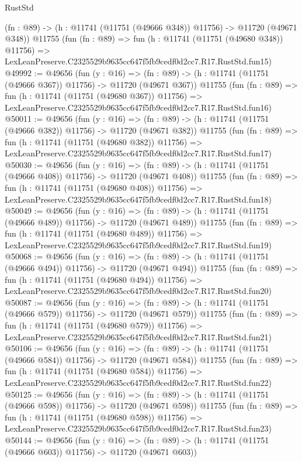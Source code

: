 \begin{lexlean}{RustStd}
\begin{coremodule}
    (fn : @89) -> (h : @11741 (@11751 (@49666 @348)) @11756) -> @11720 (@49671 @348))
    @11755
    (fun (fn : @89) =>
    fun (h : @11741 (@11751 (@49680 @348)) @11756) =>
    LexLeanPreserve.C2325529b9635cc647f5fb9cedf0d2cc7.R17.RustStd.fun15)
@49992 := @49656
    (fun (y : @16) =>
    (fn : @89) -> (h : @11741 (@11751 (@49666 @367)) @11756) -> @11720 (@49671 @367))
    @11755
    (fun (fn : @89) =>
    fun (h : @11741 (@11751 (@49680 @367)) @11756) =>
    LexLeanPreserve.C2325529b9635cc647f5fb9cedf0d2cc7.R17.RustStd.fun16)
@50011 := @49656
    (fun (y : @16) =>
    (fn : @89) -> (h : @11741 (@11751 (@49666 @382)) @11756) -> @11720 (@49671 @382))
    @11755
    (fun (fn : @89) =>
    fun (h : @11741 (@11751 (@49680 @382)) @11756) =>
    LexLeanPreserve.C2325529b9635cc647f5fb9cedf0d2cc7.R17.RustStd.fun17)
@50030 := @49656
    (fun (y : @16) =>
    (fn : @89) -> (h : @11741 (@11751 (@49666 @408)) @11756) -> @11720 (@49671 @408))
    @11755
    (fun (fn : @89) =>
    fun (h : @11741 (@11751 (@49680 @408)) @11756) =>
    LexLeanPreserve.C2325529b9635cc647f5fb9cedf0d2cc7.R17.RustStd.fun18)
@50049 := @49656
    (fun (y : @16) =>
    (fn : @89) -> (h : @11741 (@11751 (@49666 @489)) @11756) -> @11720 (@49671 @489))
    @11755
    (fun (fn : @89) =>
    fun (h : @11741 (@11751 (@49680 @489)) @11756) =>
    LexLeanPreserve.C2325529b9635cc647f5fb9cedf0d2cc7.R17.RustStd.fun19)
@50068 := @49656
    (fun (y : @16) =>
    (fn : @89) -> (h : @11741 (@11751 (@49666 @494)) @11756) -> @11720 (@49671 @494))
    @11755
    (fun (fn : @89) =>
    fun (h : @11741 (@11751 (@49680 @494)) @11756) =>
    LexLeanPreserve.C2325529b9635cc647f5fb9cedf0d2cc7.R17.RustStd.fun20)
@50087 := @49656
    (fun (y : @16) =>
    (fn : @89) -> (h : @11741 (@11751 (@49666 @579)) @11756) -> @11720 (@49671 @579))
    @11755
    (fun (fn : @89) =>
    fun (h : @11741 (@11751 (@49680 @579)) @11756) =>
    LexLeanPreserve.C2325529b9635cc647f5fb9cedf0d2cc7.R17.RustStd.fun21)
@50106 := @49656
    (fun (y : @16) =>
    (fn : @89) -> (h : @11741 (@11751 (@49666 @584)) @11756) -> @11720 (@49671 @584))
    @11755
    (fun (fn : @89) =>
    fun (h : @11741 (@11751 (@49680 @584)) @11756) =>
    LexLeanPreserve.C2325529b9635cc647f5fb9cedf0d2cc7.R17.RustStd.fun22)
@50125 := @49656
    (fun (y : @16) =>
    (fn : @89) -> (h : @11741 (@11751 (@49666 @598)) @11756) -> @11720 (@49671 @598))
    @11755
    (fun (fn : @89) =>
    fun (h : @11741 (@11751 (@49680 @598)) @11756) =>
    LexLeanPreserve.C2325529b9635cc647f5fb9cedf0d2cc7.R17.RustStd.fun23)
@50144 := @49656
    (fun (y : @16) =>
    (fn : @89) -> (h : @11741 (@11751 (@49666 @603)) @11756) -> @11720 (@49671 @603))

\end{coremodule}
\end{lexlean}
